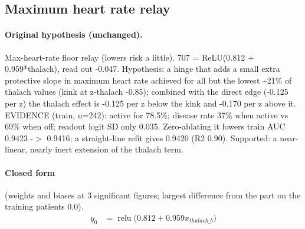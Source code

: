 \documentclass[a4paper,10pt]{article}
\newif\ifreviewmarks
\newcommand{\reviewrule}{\noindent{\color{BrickRed}\rule{\linewidth}{0.8pt}}}
\newenvironment{drafted}[1][]{%
  \ifreviewmarks\par\addvspace{\medskipamount}\reviewrule\par\nopagebreak
  \noindent{\color{BrickRed}\sffamily\footnotesize\textbf{Thesis Draft}\quad #1\hfill review}\par\nopagebreak\smallskip\fi}{%
  \ifreviewmarks\par\smallskip\noindent{\color{BrickRed}\sffamily\footnotesize end of thesis draft}\par\nopagebreak\reviewrule\par\medskip\fi}
\begin{document}
\begin{drafted}[plain-language layer: heart-s4-c1]
\subsection{Maximum heart rate relay}\label{tech:ann34}
\paragraph{Original hypothesis (unchanged).} Max-heart-rate floor relay (lowers risk a little). 707 = ReLU(0.812 + 0.959*thalach), read out -0.047. Hypothesis: a hinge that adds a small extra protective slope in maximum heart rate achieved for all but the lowest \textasciitilde{}21\% of thalach values (kink at z-thalach -0.85); combined with the direct edge (-0.125 per z) the thalach effect is -0.125 per z below the kink and -0.170 per z above it. EVIDENCE (train, n=242): active for 78.5\%; disease rate 37\% when active vs 69\% when off; readout logit SD only 0.035. Zero-ablating it lowers train AUC 0.9423 -$>$ 0.9416; a straight-line refit gives 0.9420 (R2 0.90). Supported: a near-linear, nearly inert extension of the thalach term.
\paragraph{Closed form} {\footnotesize(weights and biases at 3 significant figures; largest difference from the part on the training patients 0.0).}
{\small\begingroup\allowdisplaybreaks
\begin{align*}
y_{0} &= \operatorname{relu}\bigl(0.812 + 0.959 x_{thalach\_b}\bigr)
\end{align*}\endgroup}


\end{drafted}
\end{document}
